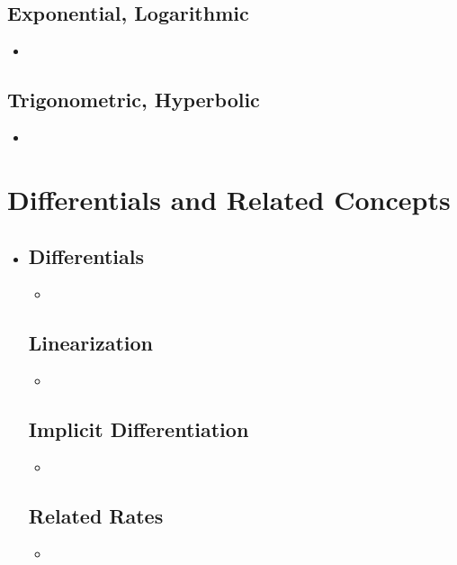 \begin{itemize}
  \subsection{Exponential, Logarithmic}
  \begin{itemize}
    \item 
  \end{itemize}

  \subsection{Trigonometric, Hyperbolic}
  \begin{itemize}
    \item 
  \end{itemize}

\end{itemize}


\section{Differentials and Related Concepts}
\begin{itemize}
  \item []
  
  \subsection{Differentials}
  \begin{itemize}
    \item 
  \end{itemize}

  \subsection{Linearization}
  \begin{itemize}
    \item 
  \end{itemize}

  \subsection{Implicit Differentiation}
  \begin{itemize}
    \item 
  \end{itemize}

  \subsection{Related Rates}
  \begin{itemize}
    \item 
  \end{itemize}
  
\end{itemize}

